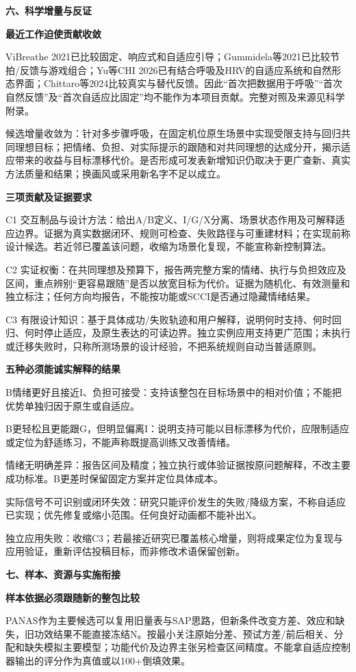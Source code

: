 \documentclass[11pt,a4paper]{article}
\newcommand{\reviewsection}[1]{\par\Needspace{9\baselineskip}\vspace{10pt}\begin{center}{\titlelatin\titlecjk\bfseries\fontsize{14}{20}\selectfont #1}\end{center}}
\newcommand{\reviewsubsection}[1]{\par\Needspace{4\baselineskip}\vspace{4pt}\begin{center}{\titlelatin\titlecjk\bfseries\fontsize{12}{18}\selectfont #1}\end{center}}
\begin{document}
\reviewsection{六、科学增量与反证}
\reviewsubsection{6.1 最近工作迫使贡献收敛}
ViBreathe 2021已比较固定、响应式和自适应引导；Gummidela等2021已比较节拍/\allowbreak{}反馈与游戏组合；Yu等CHI 2026已有结合呼吸及HRV的自适应系统和自然形态界面；Chittaro等2024比较真实与替代反馈。因此“首次把数据用于呼吸”“首次自然反馈”及“首次自适应比固定”均不能作为本项目贡献。完整对照及来源见科学附录。


候选增量收敛为：针对多步骤呼吸，在固定机位原生场景中实现受限支持与回归共同理想目标；把情绪、负担、对实际提示的跟随和对共同理想的达成分开，揭示适应带来的收益与目标漂移代价。是否形成可发表新增知识仍取决于更广查新、真实方法质量和结果；换画风或采用新名字不足以成立。


\reviewsubsection{6.2 三项贡献及证据要求}
C1 交互制品与设计方法：给出A/\allowbreak{}B定义、I/\allowbreak{}G/\allowbreak{}X分离、场景状态作用及可解释适应边界。证据为真实数据闭环、规则可检查、失败路径与可重建材料；在实现前称设计候选。若近邻已覆盖该问题，收缩为场景化复现，不能宣称新控制算法。


C2 实证权衡：在共同理想及预算下，报告两完整方案的情绪、执行与负担效应及区间，重点辨别“更容易跟随”是否以放宽目标为代价。证据为随机化、有效测量和独立标注；任何方向均报告，不能按功能或SCCI是否通过隐藏情绪结果。


C3 有限设计知识：基于具体成功/\allowbreak{}失败轨迹和用户解释，说明何时支持、何时回归、何时停止适应，及原生表达的可读边界。独立实例应用支持更广范围；未执行或迁移失败时，只称所测场景的设计经验，不把系统规则自动当普适原则。


\reviewsubsection{6.3 五种必须能诚实解释的结果}
B情绪更好且接近I、负担可接受：支持该整包在目标场景中的相对价值；不能把优势单独归因于原生或自适应。


B更轻松且更能跟G，但明显偏离I：说明支持可能以目标漂移为代价，应限制适应或定位为舒适练习，不能声称既提高训练又改善情绪。


情绪无明确差异：报告区间及精度；独立执行或体验证据按原问题解释，不改主要成功标准。B更差时保留固定方案并定位具体成本。


实际信号不可识别或闭环失效：研究只能评价发生的失败/\allowbreak{}降级方案，不称自适应已实现；优先修复或缩小范围。任何良好动画都不能补出X。


独立应用失败：收缩C3；若最接近研究已覆盖核心增量，则将成果定位为复现与应用验证，重新评估投稿目标，而非修改术语保留创新。


\reviewsection{七、样本、资源与实施衔接}
\reviewsubsection{7.1 样本依据必须跟随新的整包比较}
PANAS作为主要候选可以复用旧量表与SAP思路，但新条件改变方差、效应和缺失，旧功效结果不能直接冻结N。按最小关注原始分差、预试方差/\allowbreak{}前后相关、分配和缺失模拟主要模型；功能代价及边界主张另检查区间精度。不能拿自适应控制器输出的评分作为真值或以100+倒填效果。
\end{document}

